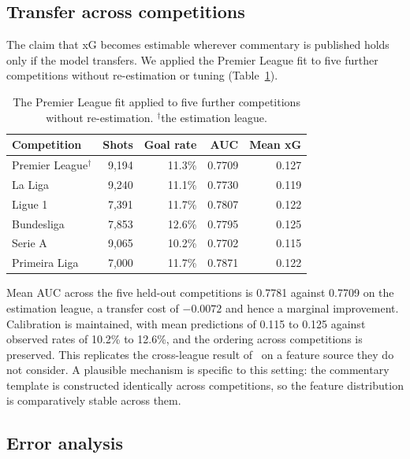 \documentclass[conference]{IEEEtran}
\newcommand{\num}[1]{\mbox{#1}}
\begin{document}
\subsection{Transfer across competitions}
\label{sec:transfer}

The claim that xG becomes estimable wherever commentary is published holds only
if the model transfers. We applied the Premier League fit to five further
competitions without re-estimation or tuning (Table~\ref{tab:transfer}).

\begin{table}[t]
\caption{The Premier League fit applied to five further competitions
without re-estimation. $^{\dagger}$the estimation league.}
\label{tab:transfer}
\centering
\footnotesize
\begin{tabular}{lrrrr}
\toprule
Competition & Shots & Goal rate & AUC & Mean xG \\
\midrule
Premier League$^{\dagger}$ & \num{9,194} & 11.3\% & \num{0.7709} & \num{0.127} \\
La Liga        & \num{9,240} & 11.1\% & \num{0.7730} & \num{0.119} \\
Ligue 1        & \num{7,391} & 11.7\% & \num{0.7807} & \num{0.122} \\
Bundesliga     & \num{7,853} & 12.6\% & \num{0.7795} & \num{0.125} \\
Serie A        & \num{9,065} & 10.2\% & \num{0.7702} & \num{0.115} \\
Primeira Liga  & \num{7,000} & 11.7\% & \num{0.7871} & \num{0.122} \\
\bottomrule
\end{tabular}
\end{table}

Mean AUC across the five held-out competitions is \num{0.7781} against
\num{0.7709} on the estimation league, a transfer cost of $-0.0072$ and hence
a marginal improvement. Calibration is maintained, with mean predictions of
\num{0.115} to \num{0.125} against observed rates of 10.2\% to 12.6\%, and the
ordering across competitions is preserved. This replicates the cross-league
result of~\cite{robberechts2020data} on a feature source they do not consider.
A plausible mechanism is specific to this setting: the commentary template is
constructed identically across competitions, so the feature distribution is
comparatively stable across them.

\subsection{Error analysis}
\label{sec:errors}
\end{document}
